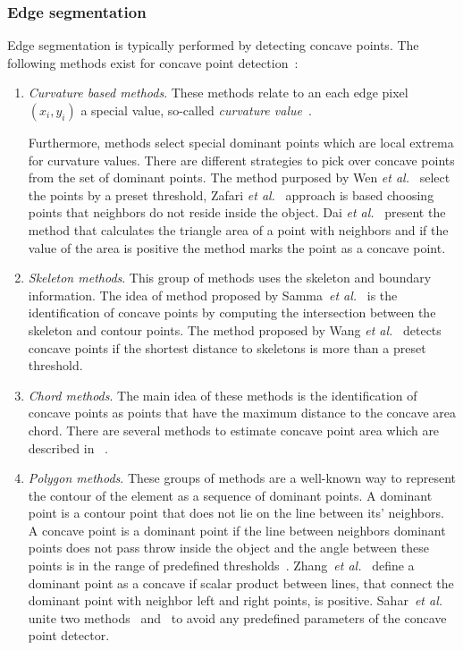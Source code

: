 \documentclass{lutmscthesis}[2010/09/22]
\begin{document}
\subsubsection{Edge segmentation}
Edge segmentation is typically performed by detecting concave points.
The following methods exist for concave point detection~\cite{zafari2017comparison}:
\begin{enumerate}
    \item 
    \textit{Curvature based methods}. 
    These methods relate to an each edge pixel $(x_i,y_i)$ a special value, so-called \textit{curvature value}~\cite{Zafari15}.
    
    
    Furthermore, methods select special dominant points which are local extrema for curvature values. There are different strategies to pick over concave points from the set of dominant points. The method purposed by Wen \emph{et al.}~\cite{curv-wen}  select the points by a preset threshold, Zafari \emph{et al.}~\cite{Zafari15} approach is based choosing points that neighbors do not reside inside the object. Dai \emph{et al.}~\cite{curv-dai} present the method that calculates the triangle area of a point with neighbors and if the value of the area is positive the method marks the point as a concave point.
   
    \item 
    \textit{Skeleton methods}. This group of methods uses the skeleton and boundary information. The idea of method proposed by Samma~\emph{et al.}~\cite{bnd-skeleton} is the identification of concave points by computing the intersection between the skeleton and contour points. The method proposed by Wang \emph{et al.}~\cite{skeleton} detects concave points if the shortest distance to skeletons is more than a preset threshold.
    \item 
    \textit{Chord methods}. The main idea of these methods is the identification of concave points as points that have the maximum distance to the concave area chord. There are several methods to estimate concave point area which are described in 
    ~\cite{chord-farhan,chord-kumar}.
    
    \item 
    \textit{Polygon methods}. These groups of methods are a well-known way to represent the contour of the element as a sequence of dominant points. A dominant point is a contour point that does not lie on the line between its' neighbors. A concave point is a dominant point if the line between neighbors dominant points does not pass throw inside the object and the angle between these points is in the range of predefined thresholds~\cite{Bai20092434}. Zhang~\emph{et al.}~\cite{bubble} define a dominant point as a concave if scalar product between lines, that connect the dominant point with neighbor left and right points, is positive. Sahar~\emph{et al.}~\cite{zafari2017comparison} unite two methods~\cite{bubble} and~\cite{Bai20092434} to avoid any predefined parameters of the concave point detector.
\end{enumerate}
\end{document}
